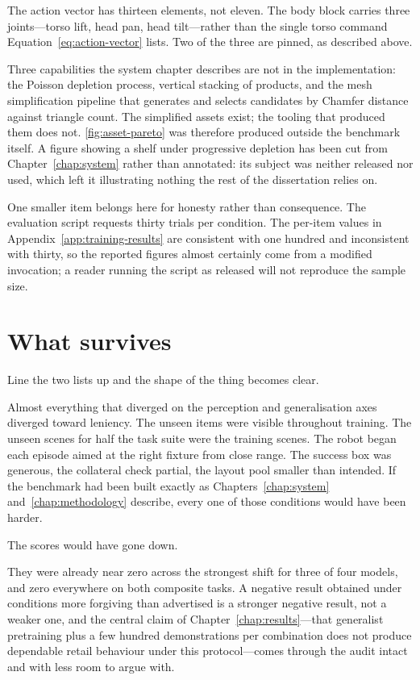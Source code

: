 The action vector has thirteen elements, not eleven. The body block carries three joints---torso lift, head pan, head tilt---rather than the single torso command Equation~\ref{eq:action-vector} lists. Two of the three are pinned, as described above.

Three capabilities the system chapter describes are not in the implementation: the Poisson depletion process, vertical stacking of products, and the mesh simplification pipeline that generates and selects candidates by Chamfer distance against triangle count. The simplified assets exist; the tooling that produced them does not. \ref{fig:asset-pareto} was therefore produced outside the benchmark itself. A figure showing a shelf under progressive depletion has been cut from Chapter~\ref{chap:system} rather than annotated: its subject was neither released nor used, which left it illustrating nothing the rest of the dissertation relies on.

One smaller item belongs here for honesty rather than consequence. The evaluation script requests thirty trials per condition. The per-item values in Appendix~\ref{app:training-results} are consistent with one hundred and inconsistent with thirty, so the reported figures almost certainly come from a modified invocation; a reader running the script as released will not reproduce the sample size.

\section{What survives}
\label{sec:audit-survives}

Line the two lists up and the shape of the thing becomes clear.

Almost everything that diverged on the perception and generalisation axes diverged toward leniency. The unseen items were visible throughout training. The unseen scenes for half the task suite were the training scenes. The robot began each episode aimed at the right fixture from close range. The success box was generous, the collateral check partial, the layout pool smaller than intended. If the benchmark had been built exactly as Chapters~\ref{chap:system} and~\ref{chap:methodology} describe, every one of those conditions would have been harder.

The scores would have gone down.

They were already near zero across the strongest shift for three of four models, and zero everywhere on both composite tasks. A negative result obtained under conditions more forgiving than advertised is a stronger negative result, not a weaker one, and the central claim of Chapter~\ref{chap:results}---that generalist pretraining plus a few hundred demonstrations per combination does not produce dependable retail behaviour under this protocol---comes through the audit intact and with less room to argue with.

